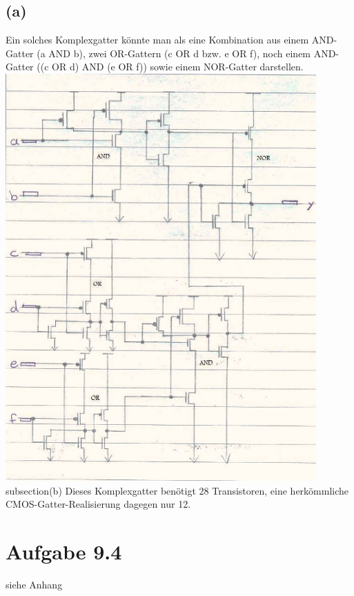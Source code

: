 \documentclass[12pt]{article}
\begin{document}
\subsection{(a)}
Ein solches Komplexgatter könnte man als eine Kombination aus einem
AND-Gatter (a AND b), zwei OR-Gattern (c OR d bzw. e OR f), noch
einem AND-Gatter ((c OR d) AND (e OR f)) sowie einem NOR-Gatter
darstellen.
\includegraphics{Schaltskizze93a}
subsection{(b)}
Dieses Komplexgatter benötigt 28 Transistoren, eine herkömmliche CMOS-Gatter-Realisierung dagegen nur 12.

\section{Aufgabe 9.4}
siehe Anhang
\end{document}
